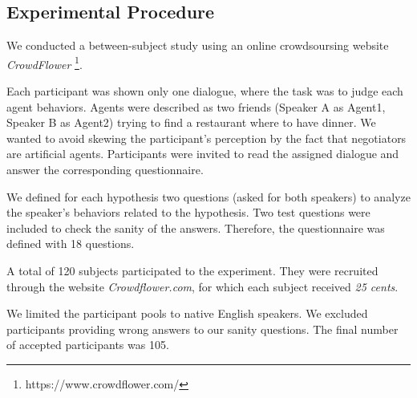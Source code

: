 \documentclass{llncs}
\begin{document}
	\subsection{Experimental Procedure}
	
	We conducted a between-subject study using an online crowdsoursing website \emph{CrowdFlower} \footnote{https://www.crowdflower.com/}. 
	
	
	Each participant was shown only one dialogue, where the task was to judge each agent behaviors. Agents were described as two friends (Speaker A as Agent1, Speaker B as Agent2) trying to find a restaurant where to have dinner. We wanted to avoid skewing the participant's perception by the fact that negotiators are artificial agents. Participants were invited to read the assigned dialogue and answer the corresponding questionnaire. 
	
	We defined for each hypothesis two questions (asked for both speakers) to analyze the speaker's behaviors related to the hypothesis. 
	Two test questions were included to check the sanity of the answers. Therefore, the questionnaire was defined with 18 questions.
	
	A total of 120 subjects participated to the experiment. They were recruited through the website \emph{Crowdflower.com}, for which each subject received \textit{25 cents}. 
	
	We limited the participant pools to native English speakers. We excluded participants providing wrong answers to our sanity questions. The final number of accepted participants was 105. 
	
\end{document}
